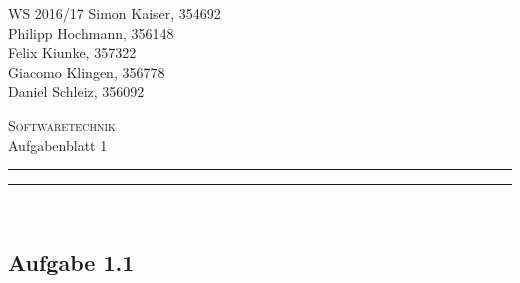 \documentclass[a4paper,graphics,11pt]{article}
\newcommand\aufgabe[1]{\subsection*{Aufgabe #1}}
\newcommand\aufgabenteil[1]{\subsubsection*{#1}}
\begin{document}
\noindent WS 2016/17        \hfill Simon Kaiser, 354692 \\
\null                                     \hfill Philipp Hochmann, 356148 \\
\null                                     \hfill Felix Kiunke, 357322 \\
\null                                     \hfill Giacomo Klingen, 356778 \\
\null                                     \hfill Daniel Schleiz, 356092 \\

\begin{center}
\Large \textsc{Softwaretechnik} \\   %
\large Aufgabenblatt 1                        %
\end{center}
\begin{center}
\rule[0.5ex]{\textwidth}{0.6pt}\vspace*{-\baselineskip}\vspace{3.2pt}
\rule[0.5ex]{\textwidth}{1.6pt}\\
\end{center}


%
% 

\aufgabe{1.1}
\end{document}
